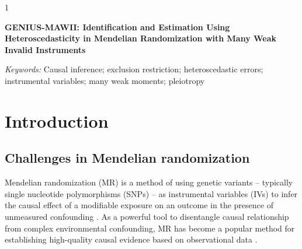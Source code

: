 \documentclass[12pt]{article}
\newcommand{\blind}{1}
\begin{document}
\blind
{
  \bigskip
  \bigskip
  \bigskip
  \begin{center} 
    {\LARGE\bf GENIUS-MAWII: Identification and Estimation Using Heteroscedasticity in Mendelian Randomization with Many Weak Invalid Instruments}
\end{center}
  \medskip
} \fi

\bigskip
\begin{abstract}
Mendelian randomization (MR) addresses causal questions by using genetic variants as instrumental variables. We propose a new MR method, GENIUS-MAWII, which simultaneously addresses the two salient challenges in MR: many weak instruments and widespread horizontal pleiotropy. Similar to MR-GENIUS, we use heteroscedasticity of the exposure to identify the treatment effect. We derive influence functions of the treatment effect, and then we construct a continuous updating estimator and establish its asymptotic properties under a many weak invalid instruments asymptotic regime by developing novel semiparametric theory. We also provide a measure of weak identification, an overidentification test, and a graphical diagnostic tool. 
\end{abstract}

\noindent%
{\it Keywords:}  Causal inference; exclusion restriction; heteroscedastic errors; instrumental variables;
many weak moments; pleiotropy
\vfill

\newpage
{} %

\section{Introduction}
\label{sec: intro}

\vspace{-3mm}

\subsection{Challenges in Mendelian randomization}
Mendelian randomization (MR) is a method of using genetic variants -- typically single nucleotide polymorphisms (SNPs) -- as instrumental variables (IVs) to infer the causal effect of  a modifiable exposure on an outcome in the presence of unmeasured confounding \citep{Davey-Smith:2003aa, Smith:2004aa, Lawlor:2008aa, Davey-Smith:2014aa, Burgess:2015ab, Burgess:2015ad,  Zheng:2017aa}. As a powerful tool to disentangle causal relationship from complex environmental confounding, MR has become a popular method for establishing high-quality causal evidence based on observational data \citep{ Pingault:2018aa, Adam:2019aa}. 
\end{document}
